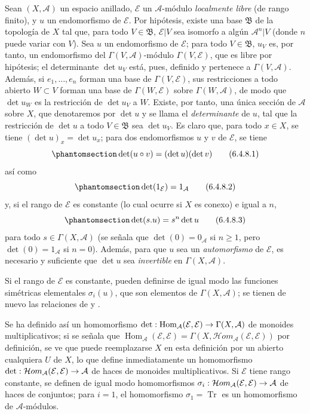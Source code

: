 \documentclass[oneside,10pt]{amsart}
\makeatletter
\renewcommand{\geq}{\geqslant}
\newcommand{\ega@arrow}[2]{\mathchoice{#1}{#2}{#2}{#2}}
\renewcommand{\to}{\ega@arrow{\longrightarrow}{\rightarrow}}
\newcommand{\oldpage}[2][]{\marginnote{\normalfont\footnotesize\textbf{#1}~|~#2}\ignorespaces}
\let\EGAOriginalLabel\label
\renewcommand{\label}[1]{\phantomsection\EGAOriginalLabel{#1}}
\makeatother
\begin{document}
\begin{env}[6.4.8]
\label{II.6.4.8-fr}
Sean $(X,\mathcal{A})$ un espacio anillado, $\mathcal{E}$ un $\mathcal{A}$-módulo \emph{localmente libre} (de rango finito), y $u$ un endomorfismo de $\mathcal{E}$.
Por hipótesis, existe una base $\mathfrak{B}$ de la topología de $X$ tal que, para todo $V\in\mathfrak{B}$, $\mathcal{E}|V$ sea isomorfo a algún $\mathcal{A}^n|V$ (donde $n$ puede variar con $V$).
Sea $u$ un endomorfismo de $\mathcal{E}$; para todo $V\in\mathfrak{B}$, $u_V$ es, por tanto, un endomorfismo del $\Gamma(V,\mathcal{A})$-módulo $\Gamma(V,\mathcal{E})$, que es libre por hipótesis;
el determinante $\det u_V$ está, pues, definido y pertenece a $\Gamma(V,\mathcal{A})$.
Además, si $e_1,\ldots,e_n$ forman una base de $\Gamma(V,\mathcal{E})$, sus restricciones a todo abierto $W\subset V$ forman una base de $\Gamma(W,\mathcal{E})$ sobre $\Gamma(W,\mathcal{A})$, de modo que $\det u_W$ es la restricción de $\det u_V$ a $W$.
Existe, por tanto, una única sección de $\mathcal{A}$ sobre $X$, que denotaremos por $\det u$ y se llama el \emph{determinante} de $u$, tal que la restricción de $\det u$ a todo $V\in\mathfrak{B}$ sea $\det u_V$.
Es claro que, para todo $x\in X$, se tiene $(\det u)_x=\det u_x$;
para dos endomorfismos $u$ y $v$ de $\mathcal{E}$, se tiene
\[
\label{II.6.4.8.1-fr}
\det(u\circ v)=(\det u)(\det v)
\tag{6.4.8.1}
\]
así como
\[
\label{II.6.4.8.2-fr}
\det(1_{\mathcal{E}})=1_{\mathcal{A}}
\tag{6.4.8.2}
\]
y, si el rango de $\mathcal{E}$ es constante (lo cual ocurre  si $X$ es conexo) e igual a $n$,
\[
\label{II.6.4.8.3-fr}
\det(s.u)=s^n\det u
\tag{6.4.8.3}
\]
para todo $s\in\Gamma(X,\mathcal{A})$ (se señala que $\det(0)=0_{\mathcal{A}}$ si $n\geq1$, pero $\det(0)=1_{\mathcal{A}}$ si $n=0$).
Además, para que $u$ sea un \emph{automorfismo} de $\mathcal{E}$, es necesario y suficiente que $\det u$ sea \emph{invertible} en $\Gamma(X,\mathcal{A})$.

Si el rango de $\mathcal{E}$ es constante, pueden definirse de igual modo las funciones simétricas elementales $\sigma_i(u)$, que son elementos de $\Gamma(X,\mathcal{A})$;
se tienen de nuevo las relaciones de  y .

\oldpage[II]{124}
Se ha definido así un homomorfismo $\det:\operatorname{Hom}_{\mathcal{A}}(\mathcal{E},\mathcal{E})
\to\Gamma(X,\mathcal{A})$ de monoides multiplicativos;
si se señala que $\operatorname{Hom}_{\mathcal{A}}(\mathcal{E},\mathcal{E})=
\Gamma(X,\mathcal{H}om_{\mathcal{A}}(\mathcal{E},\mathcal{E}))$ por definición, se ve que puede reemplazarse $X$ en esta definición por un abierto cualquiera $U$ de $X$, lo que define inmediatamente un homomorfismo $\det:\mathcal{H}om_{\mathcal{A}}(\mathcal{E},\mathcal{E})\to\mathcal{A}$ de haces de monoides multiplicativos.
Si $\mathcal{E}$ tiene rango constante, se definen de igual modo homomorfismos $\sigma_i:\mathcal{H}om_{\mathcal{A}}(\mathcal{E},\mathcal{E})
\to\mathcal{A}$ de haces de conjuntos;
para $i=1$, el homomorfismo $\sigma_1=\operatorname{Tr}$ es un homomorfismo de $\mathcal{A}$-módulos.


\end{env}
\end{document}
